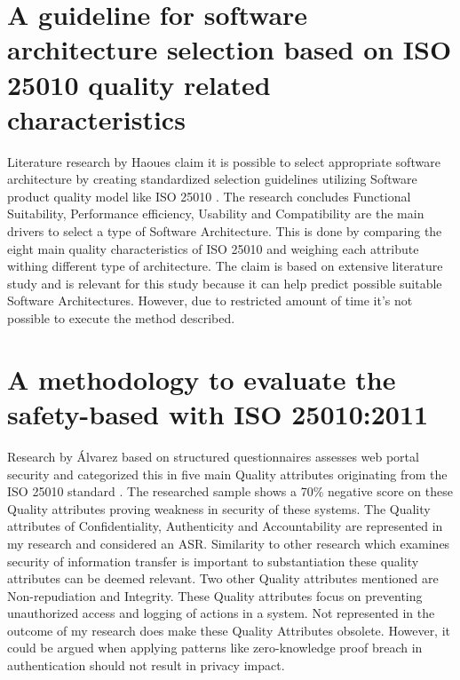 \section{A guideline for software architecture selection based on ISO 25010 quality related characteristics}
Literature research by Haoues \etal \cite{Haoues2017AGF} claim it is possible to select appropriate software architecture by creating standardized selection guidelines utilizing Software product quality model like ISO 25010 \cite{ISO:25010:2011}. The research concludes Functional Suitability, Performance efficiency, Usability and Compatibility are the main drivers to select a type of Software Architecture. This is done by comparing the eight main quality characteristics of ISO 25010 and weighing each attribute withing different type of architecture. The claim is based on extensive literature study and is relevant for this study because it can help predict possible suitable Software Architectures. However, due to restricted amount of time it's not possible to execute the method described. 

\section{A methodology to evaluate the safety-based with ISO 25010:2011} 
Research by {\'A}lvarez \etal \cite{Mexlvarez2021AMT} based on structured questionnaires assesses web portal security and categorized this in five main Quality attributes originating from the ISO 25010 standard \cite{ISO:25010:2011}. The researched sample shows a 70\% negative score on these Quality attributes proving weakness in security of these systems. The Quality attributes of Confidentiality, Authenticity and Accountability are represented in my research and considered an ASR. Similarity to other research which examines security of information transfer is important to substantiation these quality attributes can be deemed relevant. Two other Quality attributes mentioned are Non-repudiation and Integrity. These Quality attributes focus on preventing unauthorized access and logging of actions in a system. Not represented in the outcome of my research does make these Quality Attributes obsolete. However, it could be argued when applying patterns like zero-knowledge proof breach in authentication should not result in privacy impact.
